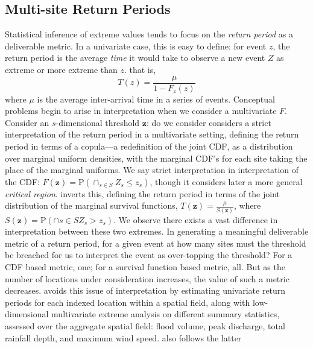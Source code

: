 \subsection{Multi-site Return Periods}
Statistical inference of extreme values tends to focus on the \emph{return period} as a deliverable
    metric.  In a univariate case, this is easy to define: for event $z$, the return period
    is the average \emph{time} it would take to observe a new event $Z$ as extreme or more extreme than $z$.
    that is,
    \[
    T(z) = \frac{\mu}{1 - F_z(z)}
    \]
    where $\mu$ is the average inter-arrival time in a series of events. Conceptual problems begin to arise
    in interpretation when we consider a multivariate $F$.  Consider an $s$-dimensional threshold $\bm{z}$:
    do we consider 
    \cite{salvadori2010} considers a strict interpretation of the return period in a multivariate setting,
    defining the return period in terms of a copula---a redefinition of the joint CDF, as a distribution
    over marginal uniform densities, with the marginal CDF's for each site taking the place of the marginal 
    uniforms.  We say strict interpretation in interpretation of the CDF: 
    $F(\bm{z}) = \text{P}\left(\cap_{s \in S}Z_s\leq z_s\right)$, though it considers later a more general
    \emph{critical region}.
    \cite{Salvadori2013} inverts this, defining the return period in terms of the joint distribution of the
    marginal survival functions, $T(\bm{z}) = \frac{\mu}{S(\bm{z})}$, where 
    $S(\bm{z}) = \text{P}\left(\cap{s\in S}Z_s > z_s\right)$.
    We observe there exists a vast difference in interpretation between these two extremes.  In generating a
    meaningful deliverable metric of a return period, for a given event at how many sites
    must the threshold be breached for us to interpret the event as over-topping the threshold?  For a CDF
    based metric, one; for a survival function based metric, all.  But as the number of locations under 
    consideration increases, the value of such a metric decreases.
    \cite{cho2023} avoids this issue of interpretation by estimating univariate return periods for each
    indexed location within a spatial field, along with low-dimensional multivariate extreme analysis 
    on different summary statistics, assessed over the aggregate spatial field: flood volume, 
    peak discharge, total rainfall depth, and maximum wind speed.  \cite{graler2013} also follows the latter 
